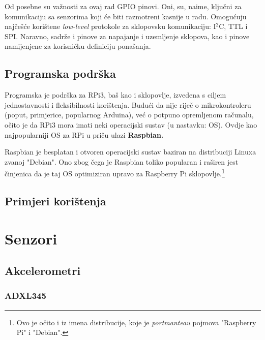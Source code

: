 \documentclass[12pt,a4paper]{article}
\begin{document}
		\par Od posebne su važnosti za ovaj rad GPIO pinovi. Oni, su, naime, ključni za komunikaciju sa senzorima koji će biti razmotreni kasnije u radu. Omogućuju najčešće korištene \textit{low-level} protokole za sklopovsku komunikaciju: I$^2$C, TTL i SPI. Naravno, sadrže i pinove za napajanje i uzemljenje sklopova, kao i pinove namijenjene za korisničku definiciju ponašanja.

	\subsection{Programska podrška}
		Programska je podrška za RPi3, baš kao i sklopovlje, izvedena s ciljem jednostavnosti i fleksibilnosti korištenja. Budući da nije riječ o mikrokontroleru (poput, primjerice, popularnog Arduina), već o potpuno opremljenom računalu, očito je da RPi3 mora imati neki operacijski sustav (u nastavku: OS). Ovdje kao najpopularniji OS za RPi u priču ulazi \textbf{Raspbian.} \\
		\par Raspbian je besplatan i otvoren operacijski sustav baziran na distribuciji Linuxa zvanoj "Debian". Ono zbog čega je Raspbian toliko popularan i raširen jest činjenica da je taj OS optimiziran upravo za Raspberry Pi sklopovlje.\footnote{Ovo je očito i iz imena distribucije, koje je \textit{portmanteau} pojmova "Raspberry Pi" i "Debian".}
	\subsection{Primjeri korištenja}
\newpage

\section{Senzori}
	\subsection{Akcelerometri}
		\subsubsection{ADXL345}
\end{document}
